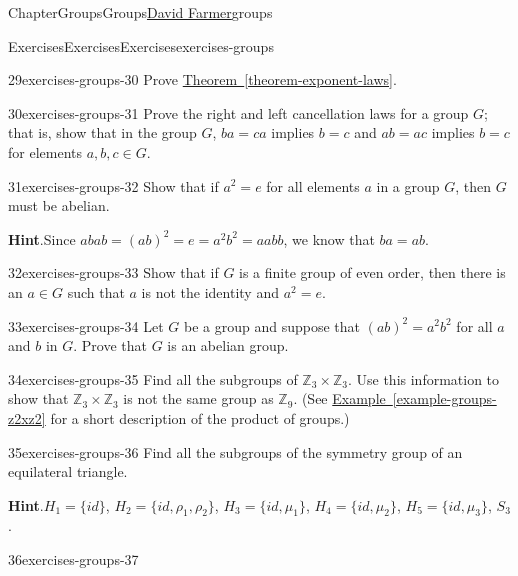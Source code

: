\documentclass[oneside,10pt,]{book}
\newcommand{\blocktitlefont}{\relax}
\newcommand{\xreffont}{\relax}
\numberwithin{equation}{section}
\begin{document}
\begin{chapterptx}{Chapter}{Groups}{}{Groups}{\hyperlink{dfarmer}{David Farmer}}{}{groups}
\begin{exercises-section}{Exercises}{Exercises}{}{Exercises}{}{}{exercises-groups}
\begin{divisionexercise}{29}{}{}{exercises-groups-30}
Prove \hyperref[theorem-exponent-laws]{Theorem~{\xreffont\ref{theorem-exponent-laws}}}.%
\end{divisionexercise}%
\begin{divisionexercise}{30}{}{}{exercises-groups-31}%
Prove the right and left cancellation laws for a group \(G\); that is, show that in the group \(G\), \(ba = ca\) implies \(b = c\) and \(ab = ac\) implies \(b = c\) for elements \(a, b, c \in G\).%
\end{divisionexercise}%
\begin{divisionexercise}{31}{}{}{exercises-groups-32}%
Show that if \(a^2 = e\) for all elements \(a\) in a group \(G\), then \(G\) must be abelian.%
\par\smallskip%
\noindent\textbf{\blocktitlefont Hint}.\hypertarget{exercises-groups-32-2}{}\quad{}Since \(abab = (ab)^2 = e = a^2 b^2 = aabb\), we know that \(ba = ab\).%
\end{divisionexercise}%
\begin{divisionexercise}{32}{}{}{exercises-groups-33}%
Show that if \(G\) is a finite group of even order, then there is an \(a \in G\) such that \(a\) is not the identity and \(a^2 = e\).%
\end{divisionexercise}%
\begin{divisionexercise}{33}{}{}{exercises-groups-34}%
Let \(G\) be a group and suppose that \((ab)^2 = a^2b^2\) for all \(a\) and \(b\) in \(G\).  Prove that \(G\) is an abelian group.%
\end{divisionexercise}%
\begin{divisionexercise}{34}{}{}{exercises-groups-35}%
Find all the subgroups of \({\mathbb Z}_3 \times {\mathbb Z}_3\). Use this information to show that \({\mathbb Z}_3 \times {\mathbb Z}_3\) is not the same group as \({\mathbb Z}_9\).  (See \hyperref[example-groups-z2xz2]{Example~{\xreffont\ref{example-groups-z2xz2}}}  for a short description of the product of groups.)%
\end{divisionexercise}%
\begin{divisionexercise}{35}{}{}{exercises-groups-36}%
Find all the subgroups of the symmetry group of an equilateral triangle.%
\par\smallskip%
\noindent\textbf{\blocktitlefont Hint}.\hypertarget{exercises-groups-36-2}{}\quad{}\(H_1 = \{ id \}\), \(H_2 = \{ id, \rho_1, \rho_2 \}\), \(H_3 = \{ id, \mu_1 \}\), \(H_4 = \{ id, \mu_2 \}\), \(H_5 = \{ id, \mu_3 \}\), \(S_3\).%
\end{divisionexercise}%
\begin{divisionexercise}{36}{}{}{exercises-groups-37}%

\end{divisionexercise}
\end{exercises-section}
\end{chapterptx}
\end{document}

